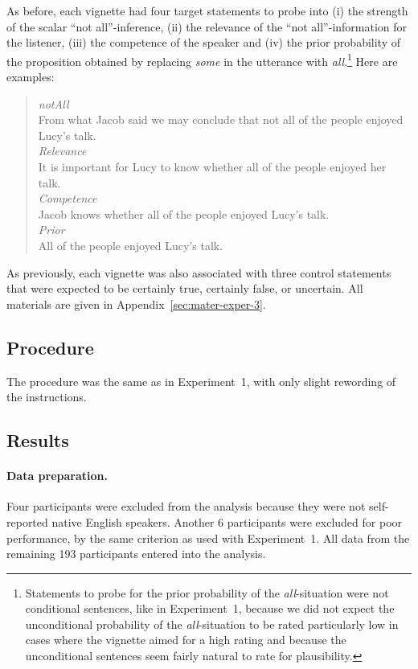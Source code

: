 \documentclass[12pt]{article}
\begin{document}
\noindent As before, each vignette had four target statements to probe into (i) the strength of
the scalar ``not all''-inference, (ii) the relevance of the ``not all''-information for the
listener, (iii) the competence of the speaker and (iv) the prior probability of the proposition
obtained by replacing \emph{some} in the utterance with \emph{all}.\footnote{Statements to
  probe for the prior probability of the \emph{all}-situation were not conditional sentences,
  like in Experiment~1, because we did not expect the unconditional probability of the
  \emph{all}-situation to be rated particularly low in cases where the vignette aimed for a
  high rating and because the unconditional sentences seem fairly natural to rate for
  plausibility.} Here are examples:

\begin{quote}
  \emph{notAll}\\
  From what Jacob said we may conclude that not all of the people enjoyed Lucy's talk.\\[.2cm]
  \emph{Relevance} \\ It is important for Lucy to know whether all of the people enjoyed her talk.\\[.2cm]
  \emph{Competence} \\ Jacob knows whether all of the people enjoyed Lucy's talk. \\[.2cm]
  \emph{Prior} \\ All of the people enjoyed Lucy's talk.
\end{quote}

\noindent As previously, each vignette was also associated with three control statements that
were expected to be certainly true, certainly false, or uncertain. All materials are given in
Appendix~\ref{sec:mater-exper-3}.

\subsection*{Procedure}

The procedure was the same as in Experiment~1, with only slight rewording of the instructions.

\subsection*{Results}

\paragraph{Data preparation.} Four participants were excluded from the analysis because they
were not self-reported native English speakers. Another 6 participants were excluded for poor
performance, by the same criterion as used with Experiment~1. All data from the remaining 193
participants entered into the analysis.
\end{document}
